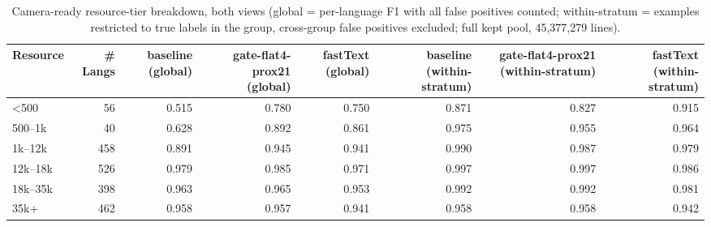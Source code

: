 \begin{table}[htbp]
\centering
\small
\begin{tabular}{lrrrrrrr}
\toprule
\textbf{Resource} & \textbf{# Langs} & \textbf{baseline (global)} & \textbf{gate-flat4-prox21 (global)} & \textbf{fastText (global)} & \textbf{baseline (within-stratum)} & \textbf{gate-flat4-prox21 (within-stratum)} & \textbf{fastText (within-stratum)} \\
\midrule
<500 & 56 & 0.515 & 0.780 & 0.750 & 0.871 & 0.827 & 0.915 \\
500--1k & 40 & 0.628 & 0.892 & 0.861 & 0.975 & 0.955 & 0.964 \\
1k--12k & 458 & 0.891 & 0.945 & 0.941 & 0.990 & 0.987 & 0.979 \\
12k--18k & 526 & 0.979 & 0.985 & 0.971 & 0.997 & 0.997 & 0.986 \\
18k--35k & 398 & 0.963 & 0.965 & 0.953 & 0.992 & 0.992 & 0.981 \\
35k+ & 462 & 0.958 & 0.957 & 0.941 & 0.958 & 0.958 & 0.942 \\
\bottomrule
\end{tabular}
\caption{Camera-ready resource-tier breakdown, both views (global = per-language F1 with all false positives counted; within-stratum = examples restricted to true labels in the group, cross-group false positives excluded; full kept pool, 45,377,279 lines).}
\label{tab:paper_breakdowns_resource}
\end{table}
